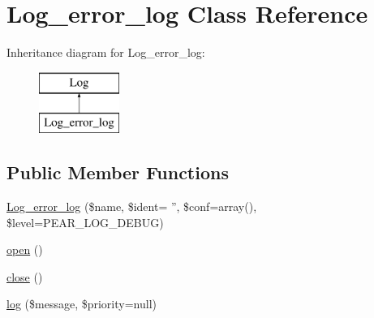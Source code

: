 \hypertarget{class_log__error__log}{
\section{Log\_\-error\_\-log Class Reference}
\label{class_log__error__log}
}
Inheritance diagram for Log\_\-error\_\-log:\begin{figure}[H]
\begin{center}
\leavevmode
\includegraphics[height=2.000000cm]{class_log__error__log}
\end{center}
\end{figure}
\subsection*{Public Member Functions}
\begin{DoxyCompactItemize}
\item 
\hyperlink{class_log__error__log_af97c74b7ff1f287b61b5b8fe98639fb7}{Log\_\-error\_\-log} (\$name, \$ident= '', \$conf=array(), \$level=PEAR\_\-LOG\_\-DEBUG)
\item 
\hyperlink{class_log__error__log_a44a2ac59a3b91f8c18905dce700934d6}{open} ()
\item 
\hyperlink{class_log__error__log_aa69c8bf1f1dcf4e72552efff1fe3e87e}{close} ()
\item 
\hyperlink{class_log__error__log_ac3758dfa38a67df158a446847cf06413}{log} (\$message, \$priority=null)
\end{DoxyCompactItemize}
